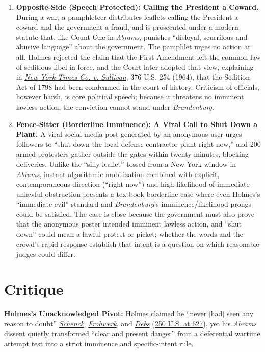 \documentclass[12pt]{article}
\begin{document}
\begin{enumerate}
\item \textbf{Opposite-Side (Speech Protected): Calling the President a Coward.} During a war, a pamphleteer distributes leaflets calling the President a coward and the government a fraud, and is prosecuted under a modern statute that, like Count One in \textit{Abrams}, punishes ``disloyal, scurrilous and abusive language'' about the government. The pamphlet urges no action at all. Holmes rejected the claim that the First Amendment left the common law of seditious libel in force, and the Court later adopted that view, explaining in \href{https://supreme.justia.com/cases/federal/us/376/254/}{\textit{New York Times Co. v. Sullivan}}, 376 U.S. 254 (1964), that the Sedition Act of 1798 had been condemned in the court of history. Criticism of officials, however harsh, is core political speech; because it threatens no imminent lawless action, the conviction cannot stand under \textit{Brandenburg}.

\item \textbf{Fence-Sitter (Borderline Imminence): A Viral Call to Shut Down a Plant.} A viral social-media post generated by an anonymous user urges followers to ``shut down the local defense-contractor plant right now,'' and 200 armed protesters gather outside the gates within twenty minutes, blocking deliveries. Unlike the ``silly leaflet'' tossed from a New York window in \emph{Abrams}, instant algorithmic mobilization combined with explicit, contemporaneous direction (``right now'') and high likelihood of immediate unlawful obstruction presents a textbook borderline case where even Holmes's ``immediate evil'' standard and \emph{Brandenburg}'s imminence/likelihood prongs could be satisfied. The case is close because the government must also prove that the anonymous poster intended imminent lawless action, and ``shut down'' could mean a lawful protest or picket; whether the words and the crowd's rapid response establish that intent is a question on which reasonable judges could differ.

\end{enumerate}

\section{Critique}
\textbf{Holmes's Unacknowledged Pivot:} Holmes claimed he ``never [had] seen any reason to doubt'' \href{https://supreme.justia.com/cases/federal/us/249/47/}{\emph{Schenck}}, \href{https://supreme.justia.com/cases/federal/us/249/204/}{\emph{Frohwerk}}, and \href{https://supreme.justia.com/cases/federal/us/249/211/}{\emph{Debs}} (\href{https://supreme.justia.com/cases/federal/us/250/616/}{250 U.S. at 627}), yet his \emph{Abrams} dissent quietly transformed ``clear and present danger'' from a deferential wartime attempt test into a strict imminence and specific-intent rule.
\end{document}
